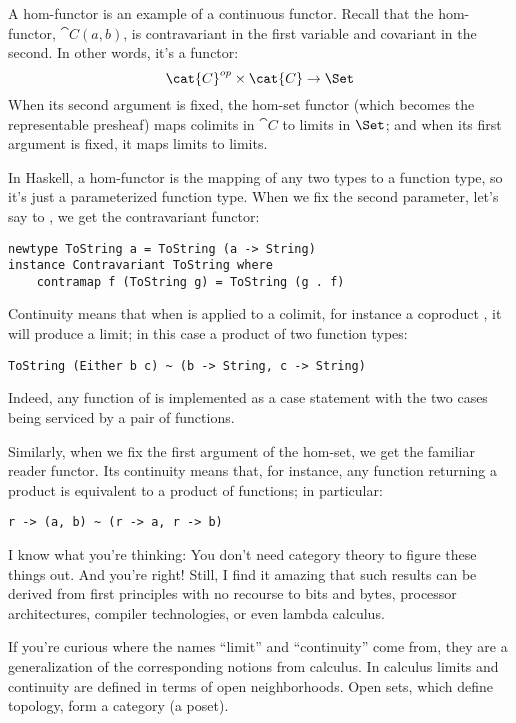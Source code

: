 A hom-functor is an example of a continuous functor. Recall that the
hom-functor, $\cat{C}(a, b)$, is contravariant in the first variable
and covariant in the second. In other words, it's a functor:
\[\cat{C}^{op} \times \cat{C} \to \Set\]
When its second argument is fixed, the hom-set functor (which becomes
the representable presheaf) maps colimits in $\cat{C}$ to limits in
$\Set$; and when its first argument is fixed, it maps limits to
limits.

In Haskell, a hom-functor is the mapping of any two types to a function
type, so it's just a parameterized function type. When we fix the second
parameter, let's say to , we get the contravariant
functor:

\begin{Verbatim}
newtype ToString a = ToString (a -> String) 
instance Contravariant ToString where 
    contramap f (ToString g) = ToString (g . f)
\end{Verbatim}

Continuity means that when  is applied to a colimit,
for instance a coproduct , it will produce a limit;
in this case a product of two function types:

\begin{Verbatim}
ToString (Either b c) ~ (b -> String, c -> String)
\end{Verbatim}
Indeed, any function of  is implemented as a case
statement with the two cases being serviced by a pair of functions.

Similarly, when we fix the first argument of the hom-set, we get the
familiar reader functor. Its continuity means that, for instance, any
function returning a product is equivalent to a product of functions; in
particular:

\begin{Verbatim}
r -> (a, b) ~ (r -> a, r -> b)
\end{Verbatim}
I know what you're thinking: You don't need category theory to figure
these things out. And you're right! Still, I find it amazing that such
results can be derived from first principles with no recourse to bits
and bytes, processor architectures, compiler technologies, or even
lambda calculus.

If you're curious where the names ``limit'' and ``continuity'' come
from, they are a generalization of the corresponding notions from
calculus. In calculus limits and continuity are defined in terms of open
neighborhoods. Open sets, which define topology, form a category (a
poset).

